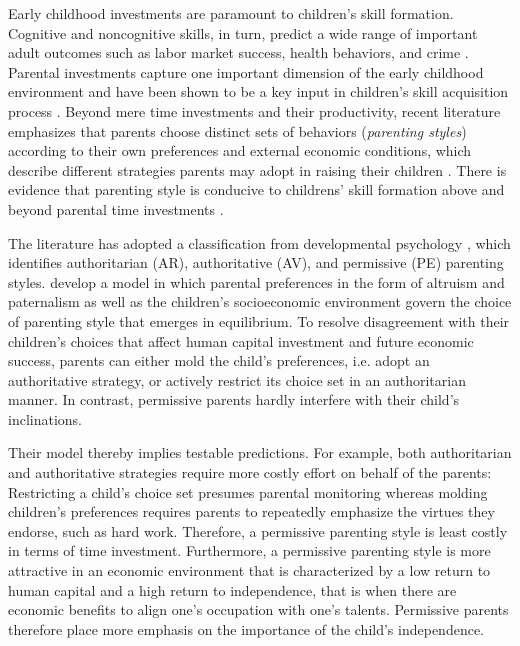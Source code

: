 Early childhood investments are paramount to children's skill formation. Cognitive and noncognitive skills, in turn, predict a wide range of important adult outcomes such as labor market success, health behaviors, and crime \parencites[e.g.][]{heckmanEffectsCognitiveNoncognitive2006}{almlundPersonalityPsychologyEconomics2011}. Parental investments capture one important dimension of the early childhood environment and have been shown to be a key input in children's skill acquisition process \parencites[e.g.][]{falkSocioEconomicStatusInequalities2021}{attanasioEstimatingProductionFunction2020}. Beyond mere time investments and their productivity, recent literature emphasizes that parents choose distinct sets of behaviors (\textit{parenting styles}) according to their own preferences and external economic conditions, which describe different strategies parents may adopt in raising their children \parencites{doepkeParentingStyleAltruism2017}{doepkeEconomicsParenting2019}. There is evidence that parenting style is conducive to childrens' skill formation above and beyond parental time investments \parencite{cobb-clarkParentingStyleInvestment2019}.

The literature has adopted a classification from developmental psychology \parencite{baumrindChildCarePractices1967}, which identifies authoritarian (AR), authoritative (AV), and permissive (PE) parenting styles. \textcite{doepkeParentingStyleAltruism2017} develop a model in which parental preferences in the form of altruism and paternalism as well as the children's socioeconomic environment govern the choice of parenting style that emerges in equilibrium. To resolve disagreement with their children's choices that affect human capital investment and future economic success, parents can either mold the child's preferences, i.e. adopt an authoritative strategy, or actively restrict its choice set in an authoritarian manner. In contrast, permissive parents hardly interfere with their child's inclinations.

Their model thereby implies testable predictions. For example, both authoritarian and authoritative strategies require more costly effort on behalf of the parents: Restricting a child's choice set presumes parental monitoring whereas molding children's preferences requires parents to repeatedly emphasize the virtues they endorse, such as hard work. Therefore, a permissive parenting style is least costly in terms of time investment. Furthermore, a permissive parenting style is more attractive in an economic environment that is characterized by a low return to human capital and a high return to independence, that is when there are economic benefits to align one's occupation with one's talents. Permissive parents therefore place more emphasis on the importance of the child's independence. 


